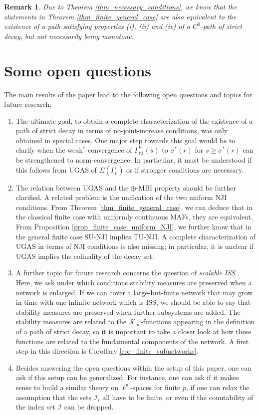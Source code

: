 \documentclass[10pt, oneside, a4paper]{article}
\newcommand{\unit}{\mathds{1}}
\newcommand{\IC}{\mathcal{I}}
\newcommand{\KC}{\mathcal{K}}
\newcommand{\bsign}[1]{\bar{#1}}
\newtheorem{remark}{Remark}[section]
\begin{document}
\begin{remark}
Due to Theorem \ref{thm_necessary_conditions}, we know that the statements in Theorem \ref{thm_finite_general_case} are also equivalent to the existence of a path satisfying properties (i), (ii) and (iv) of a $C^0$-path of strict decay, but not necessarily being monotone.
\end{remark}

\section{Some open questions}\label{sec_summary}

The main results of the paper lead to the following open questions and topics for future research:%
\begin{enumerate}
\item[1.] The ultimate goal, to obtain a complete characterization of the existence of a path of strict decay in terms of no-joint-increase conditions, was only obtained in special cases. One major step towards this goal would be to clarify when the weak$^*$-convergence of $\bsign{\Gamma}_{r\unit}^n(s)$ to $\sigma^*(r)$ for $s \geq \sigma^*(r)$ can be strengthened to norm-convergence. In particular, it must be understood if this follows from UGAS of $\Sigma(\Gamma_{\rho})$ or if stronger conditions are necessary.%
\item[2.] The relation between UGAS and the $\oplus$-MBI property should be further clarified. A related problem is the unification of the two uniform NJI conditions. From Theorem \ref{thm_finite_general_case}, we can deduce that in the classical finite case with uniformly continuous MAFs, they are equivalent. From Proposition \ref{prop_finite_case_uniform_NJI}, we further know that in the general finite case SU-NJI implies TU-NJI. A complete characterization of UGAS in terms of NJI conditions is also missing; in particular, it is unclear if UGAS implies the cofinality of the decay set.%
\item[3.] A further topic for future research concerns the question of \emph{scalable ISS} \cite{BKn}. Here, we ask under which conditions stability measures are preserved when a network is enlarged. If we can cover a large-but-finite network that may grow in time with one infinite network which is ISS, we should be able to say that stability measures are preserved when further subsystems are added. The stability measures are related to the $\KC_{\infty}$-functions appearing in the definition of a path of strict decay, so it is important to take a closer look at how these functions are related to the fundamental components of the network. A first step in this direction is Corollary \ref{cor_finite_subnetworks}.%
\item[4.] Besides answering the open questions within the setup of this paper, one can ask if this setup can be generalized. For instance, one can ask if it makes sense to build a similar theory on $\ell^p$-spaces for finite $p$, if one can relax the assumption that the sets $\IC_i$ all have to be finite, or even if the countability of the index set $\IC$ can be dropped. 
\end{enumerate}
\end{document}
